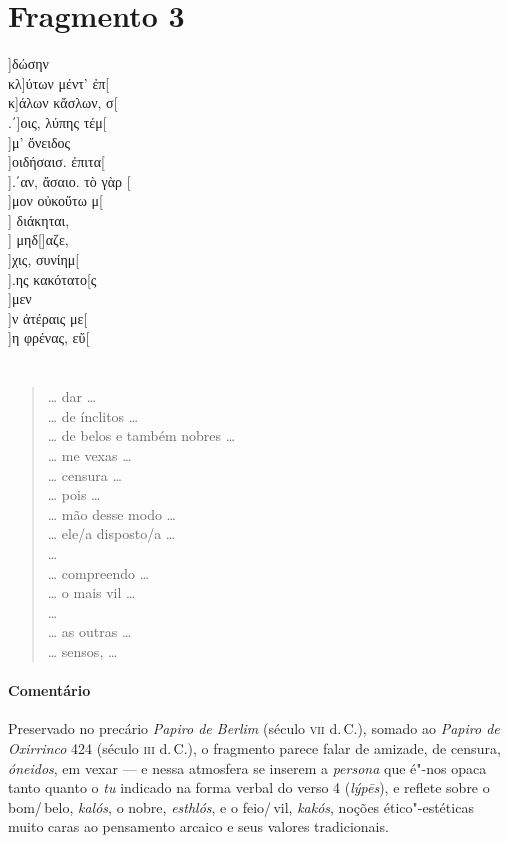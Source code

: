 \section{Fragmento 3} 

\begin{gkverse}
]δώσην\\
κλ]ύτων μέντ’ ἐπ[\\
κ]άλων κἄσλων, σ[\\
.΄]οις, λύπης τέμ[\\
 ]μ’ ὄνειδος\\
]οιδήσαισ. ἐπιτα[\\
].΄αν, ἄσαιο. τὸ γὰρ [\\
]μον οὐκοὔτω μ[\\
] διάκηται,\\
  ] μηδ[\qquad    ]αζε,\\
  ]χις, συνίημ[\\ 
].ης κακότατο[ς\\
  ]μεν\\
  ]ν ἀτέραις με[\\
]η φρένας, εὔ[
\end{gkverse}


\section*{}
\begin{verse}
\ldots{} dar \ldots{}\\
\ldots{} de ínclitos \ldots{}\\
\ldots{} de belos e também nobres \ldots{}\\
\ldots{} me vexas \ldots{}\\
\ldots{} censura \ldots{}\\
\ldots{} pois \ldots{}\\
\ldots{} mão desse modo \ldots{}\\
\ldots{} ele/a disposto/a \ldots{}\\
\ldots{}\\
\ldots{} compreendo \ldots{}\\
\ldots{} o mais vil \ldots{}\\
\ldots{}\\
\ldots{} as outras \ldots{}\\
\ldots{} sensos, \ldots{}
\end{verse}

\medskip

\paragraph{Comentário}
Preservado no precário \emph{Papiro de Berlim} (século \textsc{vii} d.\,C.), somado ao \emph{Papiro de Oxirrinco} 424 (século \textsc{iii} d.\,C.), o fragmento parece falar de amizade, de censura, \emph{óneidos}, em vexar --- e nessa atmosfera se inserem a \emph{persona} que é"-nos opaca tanto quanto o \emph{tu} indicado na  forma verbal do verso 4 (\emph{lýpēs}), e reflete sobre o bom/\,belo, \emph{kalós}, o nobre, \emph{esthlós}, e o feio/\,vil, \emph{kakós}, noções ético"-estéticas muito caras ao pensamento arcaico e seus valores tradicionais.


